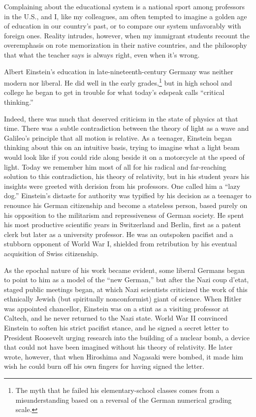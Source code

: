 \label{ch:relativity}

Complaining about the educational system is a national sport
among professors in the U.S., and I, like my colleagues, am
often tempted to imagine a golden age of education in our
country's past, or to compare our system unfavorably with
foreign ones. Reality intrudes, however, when my immigrant
students recount the overemphasis on rote memorization in
their native countries, and the philosophy that what the
teacher says is always right, even when it's wrong.

Albert Einstein's education in late-nineteenth-century
Germany was neither modern nor liberal. He did well in the
early grades,\footnote{The myth that he failed his elementary-school
classes comes from a misunderstanding based on a reversal of
the German numerical grading scale.} but in high school and
college he began to get in trouble for what today's edspeak
calls ``critical thinking.''

Indeed, there was much that deserved criticism in the state
of physics at that time. There was a subtle contradiction
between the theory of light as a wave and Galileo's
principle that all motion is relative. As a teenager, Einstein began
thinking about this on an intuitive basis,
trying to imagine what a light beam would look like if you
could ride along beside it on a motorcycle at the speed of
light. Today we remember him most of all for his radical and
far-reaching solution to this contradiction, his theory of
relativity, but in his student years his insights were
greeted with derision from his professors. One called him a
``lazy dog.'' Einstein's distaste for authority was typified
by his decision as a teenager to renounce his German
citizenship and become a stateless person, based purely on
his opposition to the militarism and repressiveness of
German society. He spent his most productive scientific
years in Switzerland and Berlin, first as a patent clerk but
later as a university professor. He was an outspoken
pacifist and a stubborn opponent of World War I, shielded
from retribution by his eventual acquisition of Swiss
citizenship.

As the epochal nature of his work became evident,
some liberal Germans began to point to him as a model of the
``new German,'' but after the Nazi coup d'etat, staged public
meetings began, at which Nazi scientists
criticized the work of this ethnically Jewish (but
spiritually nonconformist) giant of science. 
When Hitler was appointed chancellor, 
Einstein was on a stint as a visiting professor at Caltech,
and he never returned to the Nazi state. World War II convinced Einstein to soften his
strict pacifist stance, and he signed a secret letter to
President Roosevelt urging research into the building of a
nuclear bomb, a device that could not have been imagined
without his theory of relativity. He later wrote, however,
that when Hiroshima and Nagasaki were bombed, it made him
wish he could burn off his own fingers for having signed the
letter.

